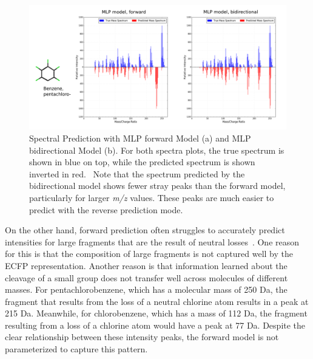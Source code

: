 \begin{figure}[ht]
    \centering
    \includegraphics[width=0.9\linewidth]{./CEOCDNVZRAIOQZ-UHFFFAOYSA-N_mlp_model_spectra.png}
        \caption[Sample Spectra Prediction]{Spectral Prediction with MLP forward Model (a) and MLP bidirectional Model (b). For both spectra plots, the true spectrum is shown in blue on top, while the predicted spectrum is shown inverted in red. ~Note that the spectrum predicted by the bidirectional model shows fewer stray peaks than the forward model, particularly for larger \textit{m/z} values. These peaks are much easier to predict with the reverse prediction mode.}
    \label{fig:MLP_improvement_spectra}
\end{figure}


On the other hand, forward prediction often struggles to accurately predict intensities for large fragments that are the result of neutral losses~\cite{stein1995ChemicalSubstructureIdentification}. One reason for this is that the composition of large fragments is not captured well by the ECFP representation. Another reason is that information learned about the cleavage of a small group does not transfer well across molecules of different masses. For pentachlorobenzene, which has a molecular mass of 250 Da, the fragment that results from the loss of a neutral chlorine atom results in a peak at 215 Da. Meanwhile, for chlorobenzene, which has a mass of 112 Da, the fragment resulting from a loss of a chlorine atom would have a peak at 77 Da. Despite the clear relationship between these intensity peaks, the forward model is not parameterized to capture this pattern.

